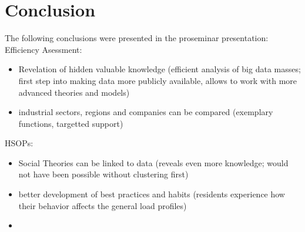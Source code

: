\chapter{Conclusion}
\label{cha:conclusion}







The following conclusions were presented in the proseminar presentation:
Efficiency Asessment:
\begin{itemize}
    \item Revelation of hidden valuable knowledge (efficient analysis of big data masses; first step into making data more publicly available, allows to work with more advanced theories and models)
    \item industrial sectors, regions and companies can be compared (exemplary functions, targetted support)
\end{itemize}

HSOPs:
\begin{itemize}
    \item Social Theories can be linked to data (reveals even more knowledge; would not have been possible without clustering first)
    \item better development of best practices and habits (residents experience how their behavior affects the general load profiles)
    \item 
\end{itemize}